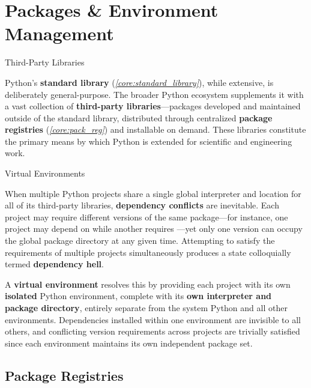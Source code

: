 \documentclass[10pt]{article}
\begin{document}
\section{Packages \& Environment Management}

  \begin{core}[label=core:third_lib]{Third-Party Libraries}

    Python's \textbf{standard library} (\textit{\autoref{core:standard_library}}), while extensive, is deliberately general-purpose. The broader Python ecosystem supplements it with a vast collection of \textbf{third-party libraries}---packages developed and maintained outside of the standard library, distributed through centralized \textbf{package registries} (\textit{\autoref{core:pack_reg}}) and installable on demand. These libraries constitute the primary means by which Python is extended for scientific and engineering work.

  \end{core}

  \begin{core}{Virtual Environments}

    When multiple Python projects share a single global interpreter and location for all of its third-party libraries, \textbf{dependency conflicts} are inevitable. Each project may require different versions of the same package---for instance, one project may depend on  while another requires ---yet only one version can occupy the global package directory at any given time. Attempting to satisfy the requirements of multiple projects simultaneously produces a state colloquially termed \textbf{dependency hell}.

    A \textbf{virtual environment} resolves this by providing each project with its own \textbf{isolated} Python environment, complete with its \textbf{own interpreter and package directory}, entirely separate from the system Python and all other environments. Dependencies installed within one environment are invisible to all others, and conflicting version requirements across projects are trivially satisfied since each environment maintains its own independent package set.

  \end{core}

  \subsection{Package Registries}
\end{document}
